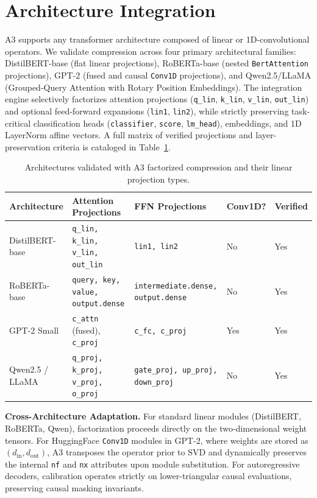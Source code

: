 
\section{Architecture Integration}
\label{sec:architecture}

A3 supports any transformer architecture composed of linear or 1D-convolutional operators. We validate compression across four primary architectural families: DistilBERT-base (flat linear projections), RoBERTa-base (nested \texttt{BertAttention} projections), GPT-2 (fused and causal \texttt{Conv1D} projections), and Qwen2.5/LLaMA (Grouped-Query Attention with Rotary Position Embeddings). The integration engine selectively factorizes attention projections (\texttt{q\_lin}, \texttt{k\_lin}, \texttt{v\_lin}, \texttt{out\_lin}) and optional feed-forward expansions (\texttt{lin1}, \texttt{lin2}), while strictly preserving task-critical classification heads (\texttt{classifier}, \texttt{score}, \texttt{lm\_head}), embeddings, and 1D LayerNorm affine vectors. A full matrix of verified projections and layer-preservation criteria is cataloged in Table~\ref{tab:architecture\_support}.

\begin{table}[t]
\centering
\small
\begin{tabular}{lllll}
\toprule
\textbf{Architecture} & \textbf{Attention Projections} & \textbf{FFN Projections} & \textbf{Conv1D?} & \textbf{Verified} \\
\midrule
DistilBERT-base & \texttt{q\_lin, k\_lin, v\_lin, out\_lin} & \texttt{lin1, lin2} & No & Yes \\
RoBERTa-base & \texttt{query, key, value, output.dense} & \texttt{intermediate.dense, output.dense} & No & Yes \\
GPT-2 Small & \texttt{c\_attn} (fused), \texttt{c\_proj} & \texttt{c\_fc, c\_proj} & Yes & Yes \\
Qwen2.5 / LLaMA & \texttt{q\_proj, k\_proj, v\_proj, o\_proj} & \texttt{gate\_proj, up\_proj, down\_proj} & No & Yes \\
\bottomrule
\end{tabular}
\caption{Architectures validated with A3 factorized compression and their linear projection types.}
\label{tab:architecture\_support}
\end{table}

\textbf{Cross-Architecture Adaptation.} For standard linear modules (DistilBERT, RoBERTa, Qwen), factorization proceeds directly on the two-dimensional weight tensors. For HuggingFace \texttt{Conv1D} modules in GPT-2, where weights are stored as $(d_\text{in}, d_\text{out})$, A3 transposes the operator prior to SVD and dynamically preserves the internal \texttt{nf} and \texttt{nx} attributes upon module substitution. For autoregressive decoders, calibration operates strictly on lower-triangular causal evaluations, preserving causal masking invariants.

